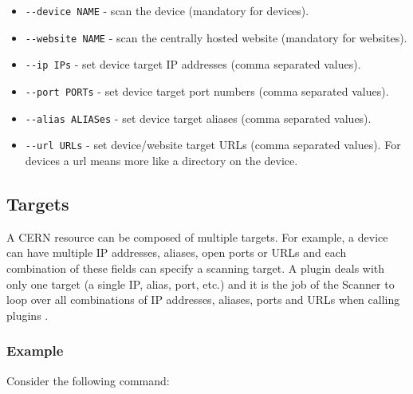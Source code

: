 \begin{itemize}

    \item    \texttt{-{}-device NAME} - scan the device (mandatory for devices).
    \item    \texttt{-{}-website NAME} - scan the centrally hosted website (mandatory for websites).
    \item    \texttt{-{}-ip IPs} - set device target IP addresses (comma separated values).
    \item    \texttt{-{}-port PORTs} - set device target port numbers (comma separated values).
    \item    \texttt{-{}-alias ALIASes} - set device target aliases (comma separated values).
    \item    \texttt{-{}-url URLs} - set device/website target URLs (comma separated values). For devices a url means more like a directory on the device. 
   \end{itemize}
   


\subsection{Targets}
A CERN resource can be composed of multiple targets. For example, a device can have multiple IP addresses, aliases, open ports or URLs and each combination of these fields can specify a scanning target. A plugin deals with only one target (a single IP, alias, port, etc.) and it is the job of the Scanner to loop over all combinations of IP addresses, aliases, ports and URLs when calling plugins .
\subsubsection{Example}
Consider the following command:

